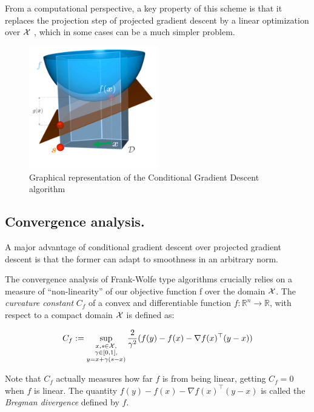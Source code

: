 From a computational perspective, a key property of this scheme is that it replaces the projection step of projected gradient descent by a linear optimization over $\mathcal{X}$ , which in some cases can be a
much simpler problem.

\begin{figure}[ht]
\begin{center}
   \includegraphics[width=0.5\textwidth]{img/frank_wolfe}
\end{center}
   \caption{Graphical representation of the Conditional Gradient Descent algorithm \cite{Jaggi2013}}
   \label{fig:frank_wolfe}
\end{figure}


\subsection{Convergence analysis.}

A major advantage of conditional gradient descent over projected gradient descent is that the former can adapt to smoothness in an arbitrary norm.

\if
The convergence analysis of Frank-Wolfe type algorithms crucially relies on a measure of “non-linearity” of our objective function f over the domain $\mathcal{X}$. The \emph{curvature constant} $C_f$ of a convex and differentiable function $f:\mathbb{R}^n \rightarrow \mathbb{R}$, with respect to a compact domain $\mathcal{X}$ is defined as:

\begin{equation} \label{eq:curv_const}
C_f := \sup_{ \substack{x,s \in \mathcal{X},\\ \gamma \in [0,1],\\ y=x+\gamma(s-x)} } \frac{2}{\gamma^2} (f(y)-f(x)-\nabla f(x)^\top (y-x))
\end{equation}

Note that $C_f$ actually measures how far $f$ is from being linear, getting $C_f=0$ when $f$ is linear. The quantity $f(y)-f(x)-\nabla f(x)^\top (y-x)$ is called the \emph{Bregman divergence} defined by $f$.
\fi


